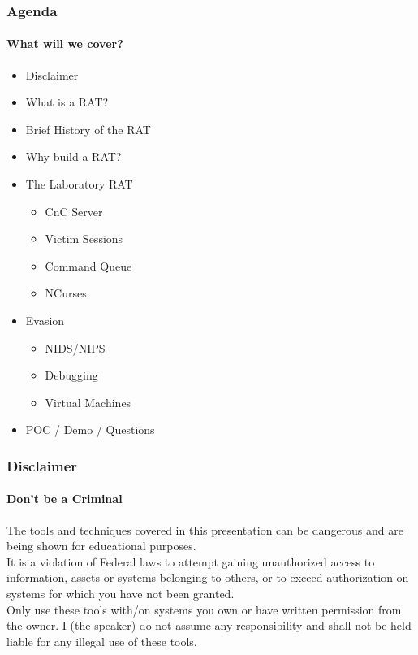 \documentclass[aspectratio=169]{beamer}
\begin{document}
\begin{frame}
  \frametitle{Agenda}
  \framesubtitle{What will we cover?}
  \begin{itemize}
  \item{Disclaimer}
  \item{What is a RAT?}
  \item{Brief History of the RAT}
  \item{Why build a RAT?}
  \item{The Laboratory RAT}
    \begin{itemize}
    \item{CnC Server}
    \item{Victim Sessions}
    \item{Command Queue}
    \item{NCurses}
    \end{itemize}
  \item{Evasion}
    \begin{itemize}
    \item{NIDS/NIPS}
    \item{Debugging}
    \item{Virtual Machines}
    \end{itemize}
  \item{POC / Demo / Questions}
  \end{itemize}
\end{frame}

\begin{frame}
  \frametitle{Disclaimer}
  \framesubtitle{Don't be a Criminal}
  \begin{tcolorbox}[title=disclaimer.log,colback=gray]
    The tools and techniques covered in this presentation can be dangerous and are\\
    being shown for educational purposes.\\
    \newline
    It is a violation of Federal laws to attempt gaining unauthorized access to information, assets or systems belonging to others, or to exceed authorization on systems for which you have not been granted.\\
    \newline
    Only use these tools with/on systems you own or have written permission from the owner. I (the speaker) do not assume any responsibility and shall not be held liable for any illegal use of these tools.\\
  \end{tcolorbox}
\end{frame}
\end{document}
